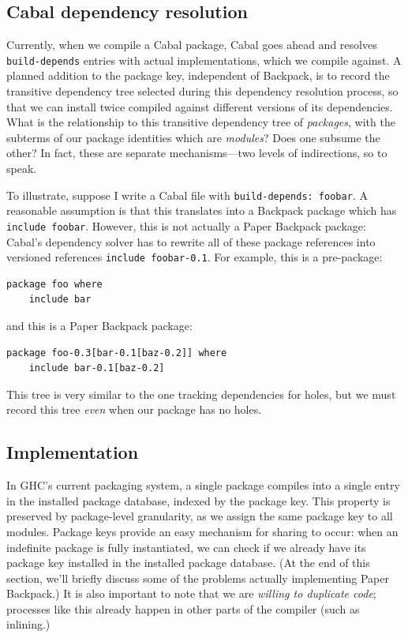 \documentclass{article}
\begin{document}
\subsection{Cabal dependency resolution}

Currently, when we compile a Cabal
package, Cabal goes ahead and resolves \verb|build-depends| entries with actual
implementations, which we compile against.  A planned addition to the package key,
independent of Backpack, is to record the transitive dependency tree selected
during this dependency resolution process, so that we can install 
twice compiled against different versions of its dependencies.
What is the relationship to this transitive dependency tree of \emph{packages},
with the subterms of our package identities which are \emph{modules}?  Does one
subsume the other?  In fact, these are separate mechanisms---two levels of indirections,
so to speak.

To illustrate, suppose I write a Cabal file with \verb|build-depends: foobar|.  A reasonable assumption is that this translates into a
Backpack package which has \verb|include foobar|.  However, this is not
actually a Paper Backpack package: Cabal's dependency solver has to
rewrite all of these package references into versioned references
\verb|include foobar-0.1|.  For example, this is a pre-package:

\begin{verbatim}
package foo where
    include bar
\end{verbatim}

and this is a Paper Backpack package:

\begin{verbatim}
package foo-0.3[bar-0.1[baz-0.2]] where
    include bar-0.1[baz-0.2]
\end{verbatim}

This tree is very similar to the one tracking dependencies for holes,
but we must record this tree \emph{even} when our package has no holes.


\subsection{Implementation}

In GHC's current packaging system, a single package compiles into a
single entry in the installed package database, indexed by the package
key.  This property is preserved by package-level granularity, as we
assign the same package key to all modules.  Package keys provide an
easy mechanism for sharing to occur: when an indefinite package is fully
instantiated, we can check if we already have its package key installed
in the installed package database.  (At the end of this section, we'll
briefly discuss some of the problems actually implementing Paper Backpack.)
It is also important to note that we are \emph{willing to duplicate code};
processes like this already happen in other parts of the compiler
(such as inlining.)
\end{document}
